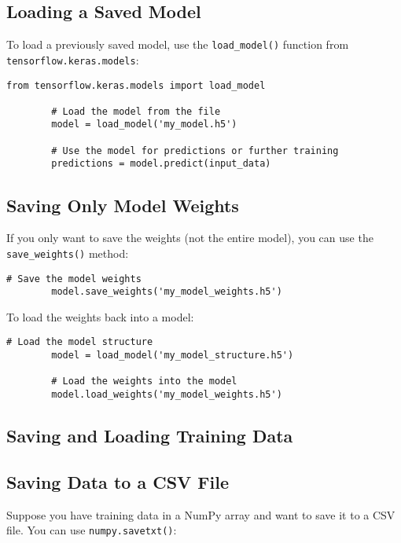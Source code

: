 	\subsection{Loading a Saved Model}
	To load a previously saved model, use the \texttt{load\_model()} function from \texttt{tensorflow.keras.models}:
	
	\begin{lstlisting}[caption={Loading a Keras Model}, label={code:load-model}, style=pythonstyle]
		from tensorflow.keras.models import load_model
		
		# Load the model from the file
		model = load_model('my_model.h5')
		
		# Use the model for predictions or further training
		predictions = model.predict(input_data)
	\end{lstlisting}
	
	\subsection{Saving Only Model Weights}
	If you only want to save the weights (not the entire model), you can use the \texttt{save\_weights()} method:
	
	\begin{lstlisting}[caption={Saving Only Model Weights}, label={code:save-weights}, style=pythonstyle]
		# Save the model weights
		model.save_weights('my_model_weights.h5')
	\end{lstlisting}
	
	To load the weights back into a model:
	
	\begin{lstlisting}[caption={Loading Model Weights}, label={code:load-weights}, style=pythonstyle]
		# Load the model structure
		model = load_model('my_model_structure.h5')
		
		# Load the weights into the model
		model.load_weights('my_model_weights.h5')
	\end{lstlisting}
	
	\subsection{Saving and Loading Training Data}
	
	\subsection{Saving Data to a CSV File}
	Suppose you have training data in a NumPy array and want to save it to a CSV file. You can use \texttt{numpy.savetxt()}:
	
